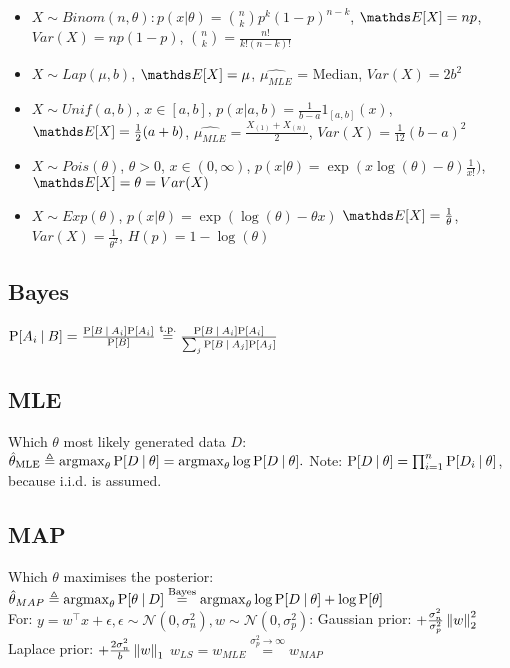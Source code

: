 \begin{itemize}
    \item $X \sim Binom(n, \theta): p(x|\theta) = \binom{n}{k}p^{k}(1-p)^{n-k}$, $\E {X}=np$, $Var(X)=np(1-p)$,
$\binom{n}{k} = \frac{n!}{k!(n-k)!}$
    \item $X \sim Lap(\mu, b)$, $\E {X} = \mu$, $\hat{\mu_{MLE}}$ = Median, $Var(X) = 2 b^2$
    \item $X \sim Unif(a, b)$, $x \in \left[ a,b \right]$,
$p(x|a,b) = \frac{1}{b-a} 1_{\left[ a,b \right]}(x)$,
$\E {X} = \frac{1}{2}(a+b)$, $\hat{\mu_{MLE}} = \frac{X_{(1)} + X_{(n)}}{2}$,
$Var(X) = \frac{1}{12}(b-a)^2$
    \item $X \sim Pois(\theta)$, $\theta > 0$, $x \in (0, \infty)$,
$p(x|\theta) = \exp (x \log(\theta)- \theta) \frac{1}{x!})$,
$\E {X} = \theta = Var(X)$
    \item $X \sim Exp(\theta)$, $p(x| \theta) = \exp ( \log(\theta) - \theta x)$
$\E {X} = \frac{1}{\theta}$,  $Var(X) =\frac{1}{\theta^2}$, $H(p) = 1- \log (\theta)$

\end{itemize}




\subsection{Bayes}
$\prob{A_{i}}[B] = \frac{\prob{B}[A_{i}]\prob{A_{i}}}{\prob{B}} \overset{\text{t.p.}}{=}
\frac{\prob{B}[A_{i}]\prob{A_{i}}}{\sum_{j}\prob{B}[A_{j}]\prob{A_{j}}}$

\subsection{MLE}
Which $\theta$ most likely generated data $D$:
$\hat{\theta}_{\text{MLE}} \triangleq \argmax_{\theta}\prob{D}[\theta] = \argmax_{\theta}\log\prob{D}[\theta].$
Note: $\prob{D}[\theta] = \prod_{i=1}^{n}\prob{D_{i}}[\theta]$, because i.i.d. is assumed.

\subsection{MAP}
Which $\theta$ maximises the posterior:
$\hat{\theta}_{MAP} \triangleq \argmax_{\theta}\prob{\theta}[D] \overset{\text{Bayes}}{=}
\argmax_{\theta}\log\prob{D}[\theta] + \log\prob{\theta}$\\
For: $y=w^{\top}x + \epsilon, \epsilon \sim \mathcal{N}(0, \sigma_{n}^{2}), w \sim \mathcal{N}(0, \sigma_{p}^{2})$:
Gaussian prior: $+\frac{\sigma_{n}^{2}}{\sigma_{p}^{2}} \left\lVert w\right\rVert_{2}^{2}$
Laplace prior: $+\frac{2\sigma_{n}^{2}}{b} \left\lVert w\right\rVert_{1}$
$w_{LS} = w_{MLE}\overset{\sigma_{p}^{2} \rightarrow \infty}{=} w_{MAP}$

